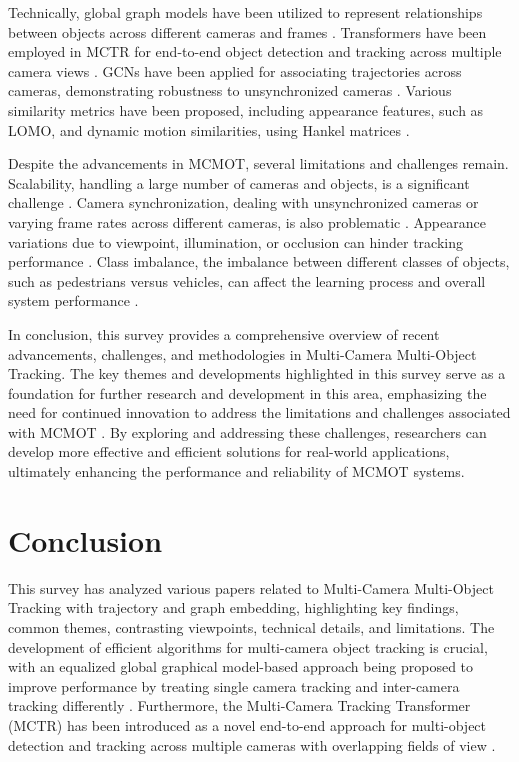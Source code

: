 \documentclass[conference]{IEEEtran}
\begin{document}
Technically, global graph models have been utilized to represent relationships between objects across different cameras and frames \cite{Global Graph Models}. Transformers have been employed in MCTR for end-to-end object detection and tracking across multiple camera views \cite{MCTR: Multi Camera Tracking Transformer}. GCNs have been applied for associating trajectories across cameras, demonstrating robustness to unsynchronized cameras \cite{Graph Convolutional Network for Multi-Target Multi-Camera Vehicle Tracking}. Various similarity metrics have been proposed, including appearance features, such as LOMO, and dynamic motion similarities, using Hankel matrices \cite{Similarity Metrics}.

Despite the advancements in MCMOT, several limitations and challenges remain. Scalability, handling a large number of cameras and objects, is a significant challenge \cite{Scalability}. Camera synchronization, dealing with unsynchronized cameras or varying frame rates across different cameras, is also problematic \cite{Camera Synchronization}. Appearance variations due to viewpoint, illumination, or occlusion can hinder tracking performance \cite{Appearance Variations}. Class imbalance, the imbalance between different classes of objects, such as pedestrians versus vehicles, can affect the learning process and overall system performance \cite{Class Imbalance}.

In conclusion, this survey provides a comprehensive overview of recent advancements, challenges, and methodologies in Multi-Camera Multi-Object Tracking. The key themes and developments highlighted in this survey serve as a foundation for further research and development in this area, emphasizing the need for continued innovation to address the limitations and challenges associated with MCMOT \cite{Multi-camera Multi-Object Tracking}. By exploring and addressing these challenges, researchers can develop more effective and efficient solutions for real-world applications, ultimately enhancing the performance and reliability of MCMOT systems.

\section{Conclusion}
This survey has analyzed various papers related to Multi-Camera Multi-Object Tracking with trajectory and graph embedding, highlighting key findings, common themes, contrasting viewpoints, technical details, and limitations. The development of efficient algorithms for multi-camera object tracking is crucial, with an equalized global graphical model-based approach being proposed to improve performance by treating single camera tracking and inter-camera tracking differently \cite{An equalised global graphical model-based approach for multi-camera object tracking}. Furthermore, the Multi-Camera Tracking Transformer (MCTR) has been introduced as a novel end-to-end approach for multi-object detection and tracking across multiple cameras with overlapping fields of view \cite{MCTR: Multi Camera Tracking Transformer}. 
\end{document}

